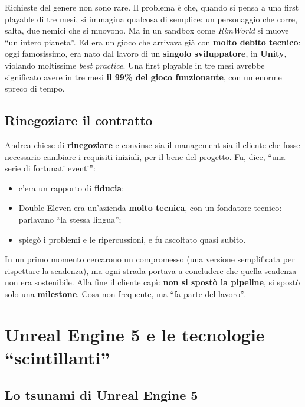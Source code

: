 Richieste del genere non sono rare. Il problema è che, quando si pensa a una first
playable di tre mesi, si immagina qualcosa di semplice: un personaggio che corre,
salta, due nemici che si muovono. Ma in un sandbox come \emph{RimWorld} si muove
``un intero pianeta''. Ed era un gioco che arrivava già con \textbf{molto debito
tecnico}: oggi famosissimo, era nato dal lavoro di un \textbf{singolo
sviluppatore}, in \textbf{Unity}, violando moltissime \emph{best practice}. Una
first playable in tre mesi avrebbe significato avere in tre mesi
\textbf{il 99\% del gioco funzionante}, con un enorme spreco di tempo.

\subsection{Rinegoziare il contratto}

Andrea chiese di \textbf{rinegoziare} e convinse sia il management sia il cliente
che fosse necessario cambiare i requisiti iniziali, per il bene del progetto. Fu,
dice, ``una serie di fortunati eventi'':
\begin{itemize}
  \item c'era un rapporto di \textbf{fiducia};
  \item Double Eleven era un'azienda \textbf{molto tecnica}, con un fondatore
        tecnico: parlavano ``la stessa lingua'';
  \item spiegò i problemi e le ripercussioni, e fu ascoltato quasi subito.
\end{itemize}
In un primo momento cercarono un compromesso (una versione semplificata per
rispettare la scadenza), ma ogni strada portava a concludere che quella scadenza non
era sostenibile. Alla fine il cliente capì: \textbf{non si spostò la pipeline}, si
spostò solo una \textbf{milestone}. Cosa non frequente, ma ``fa parte del lavoro''.

\section{Unreal Engine 5 e le tecnologie ``scintillanti''}
\label{sec:c3-2-ue5}

\subsection{Lo tsunami di Unreal Engine 5}

